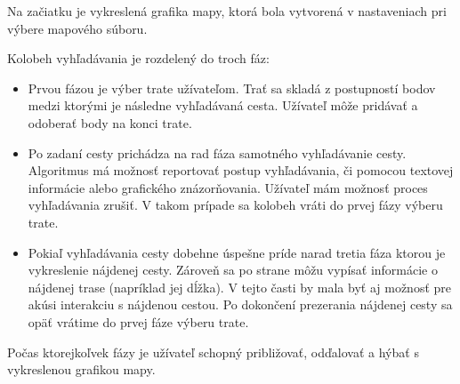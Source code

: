 Na začiatku je vykreslená grafika mapy, ktorá bola vytvorená v nastaveniach pri výbere mapového súboru.

Kolobeh vyhľadávania je rozdelený do troch fáz:
\begin{itemize}
    \item Prvou fázou je výber trate užívateľom. Trať sa skladá z postupností bodov medzi ktorými je následne vyhľadávaná cesta. Užívateľ môže pridávať a odoberať body na konci trate.
    \item Po zadaní cesty prichádza na rad fáza samotného vyhľadávanie cesty. Algoritmus má možnosť reportovať postup vyhľadávania, či pomocou textovej informácie alebo grafického znázorňovania. Užívateľ mám možnosť proces vyhľadávania zrušiť. V takom prípade sa kolobeh vráti do prvej fázy výberu trate.
    \item Pokiaľ vyhľadávania cesty dobehne úspešne príde narad tretia fáza ktorou je vykreslenie nájdenej cesty. Zároveň sa po strane môžu vypísať informácie o nájdenej trase (napríklad jej dĺžka). V tejto časti by mala byť aj možnosť pre akúsi interakciu s nájdenou cestou. Po dokončení prezerania nájdenej cesty sa opäť vrátime do prvej fáze výberu trate.  
\end{itemize}

Počas ktorejkoľvek fázy je užívateľ schopný približovať, odďalovať a hýbať s vykreslenou grafikou mapy.

